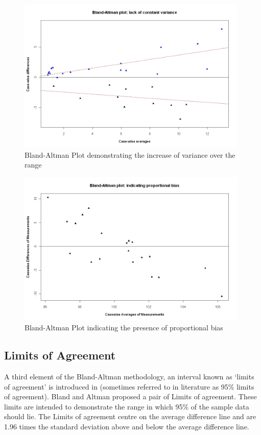 \documentclass[12pt, a4paper]{report}
\theoremstyle{plain}
\theoremstyle{definition}
\theoremstyle{remark}
\begin{document}
	\begin{figure}[h!]
		\begin{center}
			\includegraphics[width=110mm]{images/BAFanEffect.jpeg}
			\caption{Bland-Altman Plot demonstrating the increase of variance over the range}\label{BAFanEffect}
		\end{center}
	\end{figure}
	
	\begin{figure}[h!]
		\begin{center}
			\includegraphics[width=110mm]{images/PropBias.jpeg}
			\caption{Bland-Altman Plot indicating the presence of proportional bias}\label{PropBias}
		\end{center}
	\end{figure}
	
	
	\subsection{Limits of Agreement}
	A third element of the Bland-Altman methodology, an interval known
	as `limits of agreement' is introduced in \citet*{BA86}
	(sometimes referred to in literature as 95\% limits of agreement). Bland and Altman proposed a pair of Limits of agreement. These
	limits are intended to demonstrate the range in which 95\% of the
	sample data should lie. The Limits of agreement centre on the
	average difference line and are 1.96 times the standard deviation
	above and below the average difference line.
	
\end{document}
